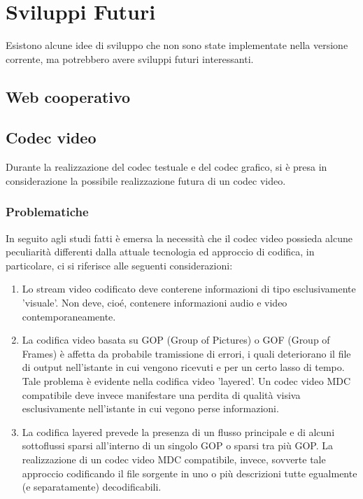 \chapter{Sviluppi Futuri}

Esistono alcune idee di sviluppo che non sono state implementate nella versione
corrente, ma potrebbero avere sviluppi futuri interessanti.


\section{Web cooperativo}

\section{Codec video}
Durante la realizzazione del codec testuale e del codec grafico, si è presa in
considerazione la possibile realizzazione futura di un codec video.

\subsection{Problematiche}

In seguito agli studi fatti è emersa la necessità che il codec video possieda
alcune peculiarità differenti dalla attuale tecnologia ed approccio di codifica, in
particolare, ci si riferisce alle seguenti considerazioni:

\begin{enumerate}
\item Lo stream video codificato deve conterene informazioni di tipo
esclusivamente 'visuale'. Non deve, cioé, contenere informazioni audio e video
contemporaneamente.

\item La codifica video basata su GOP (Group of Pictures) o GOF (Group of
Frames) è affetta da probabile tramissione di errori, i quali deteriorano il
file di output nell'istante in cui vengono ricevuti e per un certo lasso di
tempo. Tale problema è evidente nella codifica video 'layered'. Un codec video
MDC compatibile deve invece manifestare una perdita di qualità visiva
esclusivamente nell'istante in cui vegono perse informazioni.

\item La codifica layered prevede la presenza di un flusso principale e di
alcuni sottoflussi sparsi all'interno di un singolo GOP o sparsi tra più GOP.
La realizzazione di un codec video MDC compatibile, invece, sovverte tale
approccio codificando il file sorgente in uno o più descrizioni tutte egualmente
(e separatamente) decodificabili.
\end{enumerate}


